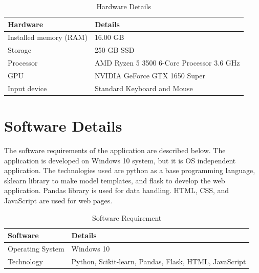 \begin{table}[H]
  \centering
  \caption{Hardware Details} \label{tab:hardware_details}
  \begin{tabular}{|L{10em}|L{25em}|}
    \hline
    \textbf{Hardware}      & \textbf{Details}
    \rule[-2ex]{0pt}{4ex}                                              \\\hline
    Installed memory (RAM) & 16.00 GB
    \rule[-2ex]{0pt}{4ex}                                              \\\hline
    Storage                & 250 GB SSD
    \rule[-2ex]{0pt}{4ex}                                              \\\hline
    Processor              & AMD Ryzen 5 3500 6-Core Processor 3.6 GHz
    \rule[-2ex]{0pt}{4ex}                                              \\\hline
    GPU                    & NVIDIA GeForce GTX 1650 Super
    \rule[-2ex]{0pt}{4ex}                                              \\\hline
    Input device           & Standard Keyboard and Mouse
    \rule[-2ex]{0pt}{4ex}                                              \\\hline
  \end{tabular}
\end{table}

\section{Software Details} \label{sec:software_details}
The software requirements of the application are described below. The application is developed on Windows 10 system, but it is OS independent application. The technologies used are python as a base programming language, sklearn library to make model templates, and flask to develop the web application. Pandas library is used for data handling. HTML, CSS, and JavaScript are used for web pages.

\begin{table}[H]
  \centering
  \caption{Software Requirement} \label{tab:software_requirement}
  \begin{tabular}{|L{10em}|L{25em}|}
    \hline
    \textbf{Software} & \textbf{Details}
    \rule[-3ex]{0pt}{6ex}                                                     \\\hline
    Operating System  & Windows 10
    \rule[-2ex]{0pt}{4ex}                                                     \\\hline
    Technology        & Python, Scikit-learn, Pandas, Flask, HTML, JavaScript
    \rule[-2ex]{0pt}{4ex}                                                     \\\hline
  \end{tabular}
\end{table}